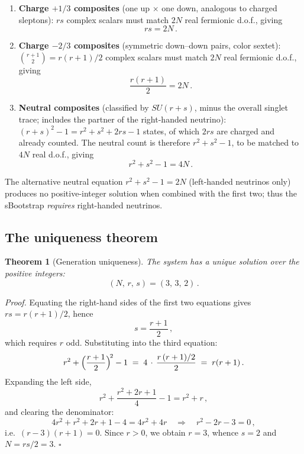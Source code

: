 \documentclass[12pt,a4paper]{article}
\begin{document}
\begin{enumerate}
\item \textbf{Charge $+1/3$ composites} (one up $\times$ one down,
analogous to charged sleptons): $rs$ complex scalars must match
$2N$ real fermionic d.o.f., giving
\begin{equation}
rs = 2N\,.
\end{equation}

\item \textbf{Charge $-2/3$ composites} (symmetric down--down pairs,
color sextet): $\binom{r+1}{2} = r(r+1)/2$ complex scalars must
match $2N$ real fermionic d.o.f., giving
\begin{equation}
\frac{r(r+1)}{2} = 2N\,.
\end{equation}

\item \textbf{Neutral composites} (classified by $SU(r+s)$, minus
the overall singlet trace; includes the partner of the right-handed
neutrino): $(r+s)^2 - 1 = r^2 + s^2 + 2rs - 1$ states, of which
$2rs$ are charged and already counted.  The neutral count is therefore
$r^2 + s^2 - 1$, to be matched to $4N$ real d.o.f., giving
\begin{equation}
r^2 + s^2 - 1 = 4N\,.
\end{equation}
\end{enumerate}

\noindent
The alternative neutral equation $r^2 + s^2 - 1 = 2N$ (left-handed
neutrinos only) produces no positive-integer solution when combined
with the first two; thus the sBootstrap \emph{requires}
right-handed neutrinos.

\subsection{The uniqueness theorem}

\medskip
\noindent\textbf{Theorem 1} (Generation uniqueness).
\textit{The system has a unique
solution over the positive integers:}
\begin{equation}
\boxed{(N,\,r,\,s) = (3,\,3,\,2)\,.}
\end{equation}

\medskip
\noindent\textit{Proof.}
Equating the right-hand sides of the first two equations
gives $rs = r(r+1)/2$, hence
\begin{equation}
s = \frac{r+1}{2}\,,
\end{equation}
which requires $r$ odd.  Substituting into the third equation:
\[
r^2 + \Bigl(\frac{r+1}{2}\Bigr)^{\!2} - 1 \;=\; 4\,\cdot\,\frac{r\,(r+1)/2}{2}
\;=\; r(r+1)\,.
\]
Expanding the left side,
\[
r^2 + \frac{r^2 + 2r + 1}{4} - 1 = r^2 + r\,,
\]
and clearing the denominator:
\[
4r^2 + r^2 + 2r + 1 - 4 = 4r^2 + 4r
\quad\Longrightarrow\quad
r^2 - 2r - 3 = 0\,,
\]
i.e.\ $(r-3)(r+1) = 0$.  Since $r > 0$, we obtain $r = 3$, whence
$s = 2$ and $N = rs/2 = 3$.
\hfill$\square$
\end{document}
